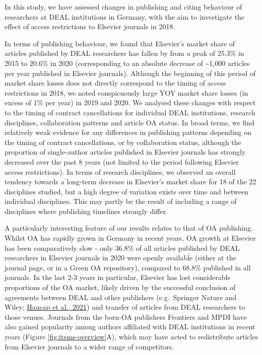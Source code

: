 \documentclass[
]{article}
\begin{document}
In this study, we have assessed changes in publishing and citing behaviour of researchers at DEAL institutions in Germany, with the aim to investigate the effect of access restrictions to Elsevier journals in 2018.

In terms of publishing behaviour, we found that Elsevier's market share of articles published by DEAL researchers has fallen by from a peak of 25.3\% in 2015 to 20.6\% in 2020 (corresponding to an absolute decrease of \textasciitilde1,000 articles per year published in Elsevier journals). Although the beginning of this period of market share losses does not directly correspond to the timing of access restrictions in 2018, we noted conspicuously large YOY market share losses (in excess of 1\% per year) in 2019 and 2020. We analysed these changes with respect to the timing of contract cancellations for individual DEAL institutions, research disciplines, collaboration patterns and article OA status. In broad terms, we find relatively weak evidence for any differences in publishing patterns depending on the timing of contract cancellations, or by collaboration status, although the proportion of single-author articles published in Elsevier journals has strongly decreased over the past 8 years (not limited to the period following Elsevier access restrictions). In terms of research disciplines, we observed an overall tendency towards a long-term decrease in Elsevier's market share for 18 of the 22 disciplines studied, but a high degree of variation exists over time and between individual disciplines. This may partly be the result of including a range of disciplines where publishing timelines strongly differ.

A particularly interesting feature of our results relates to that of OA publishing. Whilst OA has rapidly grown in Germany in recent years, OA growth at Elsevier has been comparatively slow - only 36.8\% of all articles published by DEAL researchers in Elsevier journals in 2020 were openly available (either at the journal page, or in a Green OA repository), compared to 68.8\% published in all journals. In the last 2-3 years in particular, Elsevier has lost considerable proportions of the OA market, likely driven by the successful conclusion of agreements between DEAL and other publishers (e.g.~Springer Nature and Wiley; \href{https://www.cesifo.org/en/publikationen/2021/working-paper/impact-german-deal-competition-academic-publishing-market}{Haucap et al., 2021}) and transfer of articles from DEAL researchers to those venues. Journals from the born-OA publishers Frontiers and MPDI have also gained popularity among authors affiliated with DEAL institutions in recent years (Figure \ref{fig:items-overview}A), which may have acted to redistribute articles from Elsevier journals to a wider range of competitors.
\end{document}
